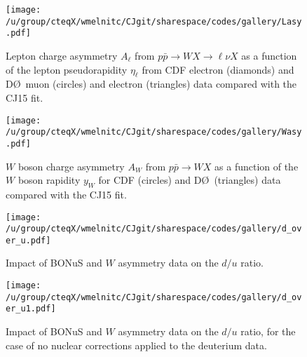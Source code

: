 \documentclass[aps,prd,amsmath,preprint]{revtex4}
\begin{document}
\begin{figure}[t]
\texttt{[image: /u/group/cteqX/wmelnitc/CJgit/sharespace/codes/gallery/Lasy.pdf]}
\caption{Lepton charge asymmetry $A_{\ell}$ from
	$p\bar p \to W X \to \ell \nu X$ as a function of the
	lepton pseudorapidity $\eta_{\ell}$ from
	CDF electron (diamonds) \cite{CDF_e} and
	D\O\ muon (circles) \cite{D0_mu} and
	electron (triangles) \cite{D0_e} data
	compared with the CJ15 fit.}
\label{fig:Lasy}
\end{figure} 

  
\begin{figure}[t]
\texttt{[image: /u/group/cteqX/wmelnitc/CJgit/sharespace/codes/gallery/Wasy.pdf]}
\caption{$W$ boson charge asymmetry $A_W$ from $p\bar p \to W X$
	as a function of the $W$ boson rapidity $y_W$ for
	CDF (circles) \cite{CDF_W} and D\O\ (triangles) \cite{D0_W} data
	compared with the CJ15 fit.}
\label{fig:Wasy}
\end{figure} 




\begin{figure}[t]
\texttt{[image: /u/group/cteqX/wmelnitc/CJgit/sharespace/codes/gallery/d\_over\_u.pdf]}
\caption{Impact of BONuS \cite{BONuS} and $W$ asymmetry data
	on the $d/u$ ratio.}
\label{fig:du}
\end{figure} 


\begin{figure}[t]
\texttt{[image: /u/group/cteqX/wmelnitc/CJgit/sharespace/codes/gallery/d\_over\_u1.pdf]}
\caption{Impact of BONuS \cite{BONuS} and $W$ asymmetry data
	on the $d/u$ ratio, for the case of no nuclear corrections
	applied to the deuterium data.}
\label{fig:du1}
\end{figure} 
\end{document}
